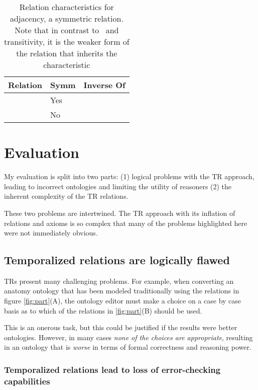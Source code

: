 \documentclass{bioinfo}
\def\partOf{\pr{part\_of}}
\def\adjacentTo{\pr{adjacent\_to}}
\def\atAllTimes{\pr{at-all-times}}
\def\atSomeTimes{\pr{at-some-times}}
\begin{document}
\begin{table}
\begin{tabular}{ | p{3cm} | p{1cm} | p{4cm} | }
\hline
\textbf{Relation} & \textbf{Symm} & \textbf{Inverse Of}  \\
\hline
\adjacentTo\ \atSomeTimes & Yes & \adjacentTo\ \atSomeTimes \\
\hline
\adjacentTo\ \atAllTimes & No & \\
\hline
\end{tabular}
\caption{Relation characteristics for adjacency, a symmetric
  relation. Note that in contrast to \partOf\ and transitivity, it is
  the weaker form of the relation that inherits the characteristic}
\label{tab:characteristics-adj}
\end{table}

\section{Evaluation}

My evaluation is split into two parts: (1) logical problems with the
TR approach, leading to incorrect ontologies and limiting the utility
of reasoners (2) the inherent complexity of the TR relations.

These two problems are intertwined. The TR approach with its inflation
of relations and axioms is so complex that many of the problems
highlighted here were not immediately obvious.

\subsection{Temporalized relations are logically flawed}

TRs present many challenging problems. For example, when converting an
anatomy ontology that has been modeled traditionally using the
relations in figure \ref{fig:part}(A), the ontology editor must make a
choice on a case by case basis as to which of the relations in
\ref{fig:part}(B) should be used.

This is an onerous task, but this could be justified if the results
were better ontologies. However, in many cases \emph{none of the
  choices are appropriate}, resulting in an ontology that is
\emph{worse} in terms of formal correctness and reasoning power.

\subsubsection{Temporalized relations lead to loss of error-checking
  capabilities}
\end{document}
